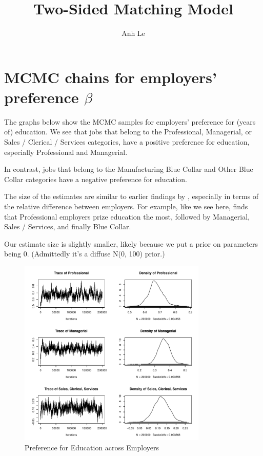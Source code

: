 \documentclass[12pt]{article}
\title{Two-Sided Matching Model}
\author{Anh Le}
\begin{document}
\maketitle

\section{MCMC chains for employers' preference $\beta$}

The graphs below show the MCMC samples for employers' preference for (years of)
education. We see that jobs that belong to the Professional, Managerial, or
Sales / Clerical / Services categories, have a positive preference for education,
especially Professional and Managerial.

In contrast, jobs that belong to the Manufacturing Blue Collar and Other Blue
Collar categories have a negative preference for education.

The size of the estimates are similar to earlier findings by
\citet{Logan1996}, especially in terms of the relative difference between
employers. For example, like we see here, \citet{Logan1996} finds that Professional employers
prize education the most, followed by Managerial, Sales / Services, and finally
Blue Collar.

Our estimate size is slightly smaller, likely because we put a prior
on parameters being 0. (Admittedly it's a diffuse N(0, 100) prior.)

\begin{figure}[!ht]
\centering
\includegraphics[width=0.8\textwidth,page=1]{"../figure/labor_occ5_beta_educ_2018-03-04 17:06:20"}
\caption{Preference for Education across Employers}
\end{figure}
\end{document}

